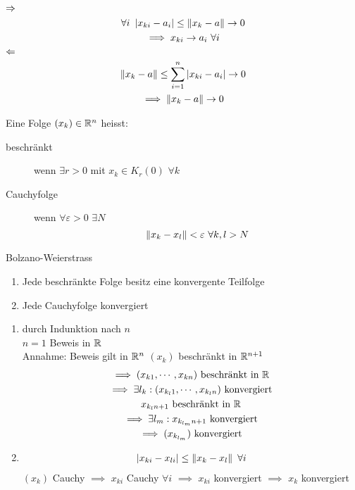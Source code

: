 \begin{Bew}
  $\Rightarrow$
  \begin{gather*}
    \forall i\ \left| x_{ki}-a_i \right|\leq \left\| x_k-a \right\|\to 0\\
    \implies x_{ki}\to a_i\ \forall i
  \end{gather*}
  $\Leftarrow$
  \begin{gather*}
    \left\| x_k-a \right\|\leq \sum^n_{i=1}\left| x_{ki}-a_i \right|\to 0\\
    \implies \left\| x_k-a \right\|\to 0
  \end{gather*}
\end{Bew}
\begin{Def}
  Eine Folge $(x_k)\in\mathbb{R}^n$ heisst:
  \begin{description}
    \item[beschränkt] wenn $\exists r>0$ mit $x_k\in K_r(0)$ $\forall k$
    \item[Cauchyfolge] wenn $\forall \varepsilon>0$ $\exists N$
      \[\left\| x_k-x_l \right\|<\varepsilon\ \forall k,l>N\]
  \end{description}
\end{Def}
\begin{Sat}{Bolzano-Weierstrass}
  \begin{enumerate}
    \item Jede beschränkte Folge besitz eine konvergente Teilfolge
    \item Jede Cauchyfolge konvergiert
  \end{enumerate}
\end{Sat}
\begin{Bew}
  \begin{enumerate}
    \item durch Indunktion nach $n$\\
      $n=1$ Beweis in $\mathbb{R}$\\
      Annahme: Beweis gilt in $\mathbb{R}^n$ $(x_k)$ beschränkt in $\mathbb{R}^{n+1}$
      \begin{gather*}
        \implies (x_{k1},\cdots,x_{kn}) \text{ beschränkt in }\mathbb{R}\\
        \implies \exists l_k:(x_{k_l1},\cdots,x_{k_ln}) \text{ konvergiert}\\
        x_{k_ln+1} \text{ beschränkt in } \mathbb{R}\\
        \implies \exists l_m:x_{k_{l_m}n+1} \text{ konvergiert}\\
        \implies (x_{k_{l_m}}) \text{ konvergiert}
      \end{gather*}
    \item
      \begin{gather*}
        \left| x_{ki}-x_{li} \right|\leq \left\| x_k-x_l \right\|\ \forall i
      \end{gather*}
      $(x_k)$ Cauchy $\implies$ $x_{ki}$ Cauchy $\forall i$ $\implies$ $x_{ki}$ konvergiert $\implies$ $x_k$ konvergiert
  \end{enumerate}
\end{Bew}

